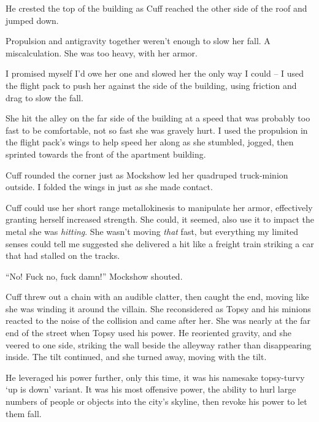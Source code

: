 He crested the top of the building as Cuff reached the other side of the roof and jumped down.



Propulsion and antigravity together weren't enough to slow her fall.  A miscalculation.  She was too heavy, with her armor.



I promised myself I'd owe her one and slowed her the only way I could – I used the flight pack to push her against the side of the building, using friction and drag to slow the fall.



She hit the alley on the far side of the building at a speed that was probably too fast to be comfortable, not so fast she was gravely hurt.  I used the propulsion in the flight pack's wings to help speed her along as she stumbled, jogged, then sprinted towards the front of the apartment building.



Cuff rounded the corner just as Mockshow led her quadruped truck-minion outside.  I folded the wings in just as she made contact.



Cuff could use her short range metallokinesis to manipulate her armor, effectively granting herself increased strength.  She could, it seemed, also use it to impact the metal she was \emph{hitting}.  She wasn't moving \emph{that} fast, but everything my limited senses could tell me suggested she delivered a hit like a freight train striking a car that had stalled on the tracks.



``No!  Fuck no, fuck damn!'' Mockshow shouted.



Cuff threw out a chain with an audible clatter, then caught the end, moving like she was winding it around the villain.  She reconsidered as Topsy and his minions reacted to the noise of the collision and came after her.  She was nearly at the far end of the street when Topsy used his power.  He reoriented gravity, and she veered to one side, striking the wall beside the alleyway rather than disappearing inside.  The tilt continued, and she turned away, moving with the tilt.



He leveraged his power further, only this time, it was his namesake topsy-turvy `up is down' variant.  It was his most offensive power, the ability to hurl large numbers of people or objects into the city's skyline, then revoke his power to let them fall.



